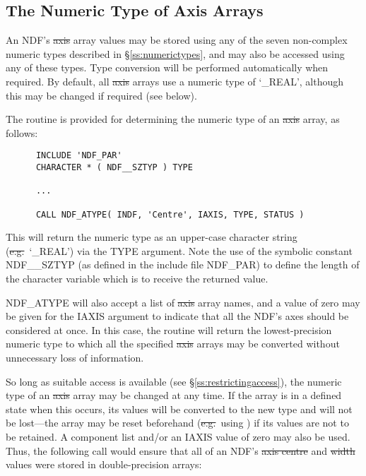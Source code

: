 \subsection{The Numeric Type of Axis Arrays}

An NDF's \st{axis\/} array values may be stored using any of the seven
non-complex numeric types described in \S\ref{ss:numerictypes}, and may also
be accessed using any of these types. 
Type conversion will be performed automatically when required. 
By default, all \st{axis\/} arrays use a numeric type of `\_REAL', although
this may be changed if required (see below). 

The routine  is provided for determining the numeric type of an
\st{axis\/} array, as follows: 

\small
\begin{verbatim}
      INCLUDE 'NDF_PAR'
      CHARACTER * ( NDF__SZTYP ) TYPE

      ...

      CALL NDF_ATYPE( INDF, 'Centre', IAXIS, TYPE, STATUS )
\end{verbatim}
\normalsize

This will return the numeric type as an upper-case character string
(\st{e.g.}\ `\_REAL') via the TYPE argument.  
Note the use of the symbolic constant NDF\_\_SZTYP (as defined in the 
include file NDF\_PAR) to define the length of the character variable which 
is to receive the returned value.

NDF\_ATYPE will also accept a list of \st{axis\/} array names, and a value
of zero may be given for the IAXIS argument to indicate that all the NDF's
axes should be considered at once. 
In this case, the routine will return the lowest-precision numeric type to
which all the specified \st{axis\/} arrays may be converted without
unnecessary loss of information. 

So long as suitable access is available (see \S\ref{ss:restrictingaccess}),
the numeric type of an \st{axis\/} array may be changed at any time. 
If the array is in a defined state when this occurs, its values will be
converted to the new type and will not be lost---the array may be reset
beforehand (\st{e.g.}\ using ) if its values are not to be
retained. 
A component list and/or an IAXIS value of zero may also be used.
Thus, the following call would ensure that all of an NDF's \st{axis
centre\/} and \st{width\/} values were stored in double-precision
arrays: 

